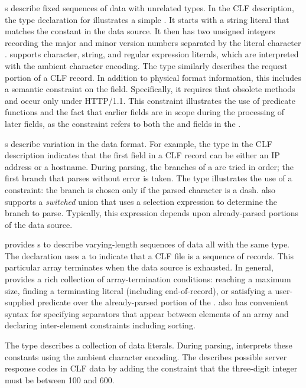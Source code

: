 \documentclass[10pt]{article}
\begin{document}
s describe fixed sequences of data with unrelated types.
In the CLF description, the type declaration for
 illustrates a simple . It starts with a 
string literal that matches the constant  in the data source.  It 
then has two unsigned integers recording the major and minor version numbers
separated by the literal character .  \pads{} supports character, string,
and regular expression literals, which are interpreted with the ambient character 
encoding. The type  
similarly describes the request portion of a CLF record.  In addition
to physical format information, this  includes a semantic constraint
on the  field.  Specifically, it requires that obsolete methods
 and  occur only under HTTP/1.1.  This constraint illustrates
the use of predicate functions and the fact 
that earlier fields are in scope during the processing of later fields, as the 
constraint
refers to both the  and  fields in the .

s describe variation in the data format.  For example, the
 type in the CLF description indicates that the first
field in a CLF record can be either an IP address or a hostname.
During parsing, the branches of a  are tried in order; the
first branch that parses without error is taken.  The 
type illustrates the use of a constraint: the branch 
is chosen only if the parsed character is a dash.  \pads{} also
supports a \textit{switched} union that uses a selection expression to
determine the branch to parse.  Typically, this expression depends
upon already-parsed portions of the data source.

\pads{} provides s to describe varying-length sequences of
data all with the same type.  The  declaration  uses a
 to indicate that a CLF file is a sequence of 
records.  This particular array terminates when the data source is
exhausted. In general, \pads{} provides a rich
collection of array-termination conditions: reaching a maximum size,
finding a terminating literal (including end-of-record), or satisfying a
user-supplied predicate over the already-parsed portion of the . 
\pads{} also has convenient syntax for 
specifying separators that appear between elements of an array and
declaring inter-element constraints including sorting.

The
 type  describes a collection of data literals.
During parsing, \pads{} interprets these constants using the ambient
character encoding.  The   describes
possible server response codes in CLF data by adding the constraint
that the three-digit integer must be between 100 and 600.
\end{document}
